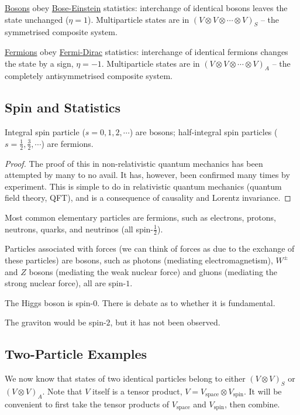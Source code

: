 \documentclass[../Main.tex]{subfiles}
\begin{document}
\underline{Bosons} obey \underline{Bose-Einstein} statistics: interchange of identical bosons leaves the state unchanged ($\eta = 1$). Multiparticle states are in $(V \otimes V \otimes \cdots \otimes V)_S$ -- the symmetrised composite system.

\underline{Fermions} obey \underline{Fermi-Dirac} statistics: interchange of identical fermions changes the state by a sign, $\eta = -1$. Multiparticle states are in $(V \otimes V \otimes \cdots \otimes V)_A$ -- the completely antisymmetrised composite system.
\subsection{Spin and Statistics}
\begin{proposition}
    Integral spin particle ($s = 0, 1, 2, \cdots$) are bosons; half-integral spin particles ($s = \frac12, \frac32, \cdots$) are fermions.
    \label{propSpinStatistic}
\end{proposition}
\begin{proof}
    The proof of this in non-relativistic quantum mechanics has been attempted by many to no avail. It has, however, been confirmed many times by experiment. This is simple to do in relativistic quantum mechanics (quantum field theory, QFT), and is a consequence of causality and Lorentz invariance.
\end{proof}
\begin{remarks}
    \item Most common elementary particles are fermions, such as electrons, protons, neutrons, quarks, and neutrinos (all spin-$\frac12$).
    \item Particles associated with forces (we can think of forces as due to the exchange of these particles) are bosons, such as photons (mediating electromagnetism), $W^\pm$ and $Z$ bosons (mediating the weak nuclear force) and gluons (mediating the strong nuclear force), all are spin-$1$.
    \item The Higgs boson is spin-$0$. There is debate as to whether it is fundamental.
    \item The graviton would be spin-$2$, but it has not been observed.
\end{remarks}
\subsection{Two-Particle Examples}
We now know that states of two identical particles belong to either $(V \otimes V)_S$ or $(V \otimes V)_A$. Note that $V$ itself is a tensor product, $V = V_{\text{space}} \otimes V_{\text{spin}}$. It will be convenient to first take the tensor products of $V_{\text{space}}$ and $V_{\text{spin}}$, then combine.
\end{document}
